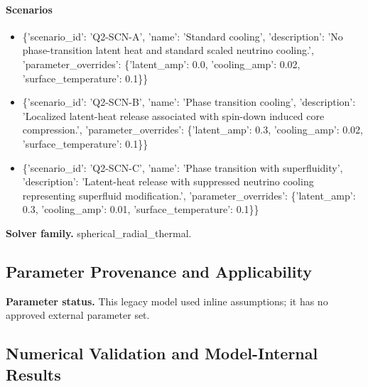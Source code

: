 \documentclass[11pt]{article}
\begin{document}
\paragraph{Scenarios}
\begin{itemize}\raggedright
\item \{'scenario\_\allowbreak{}id': 'Q2-SCN-A', 'name': 'Standard cooling', 'description': 'No phase-transition latent heat and standard scaled neutrino cooling.', 'parameter\_\allowbreak{}overrides': \{'latent\_\allowbreak{}amp': 0.0, 'cooling\_\allowbreak{}amp': 0.02, 'surface\_\allowbreak{}temperature': 0.1\}\}
\item \{'scenario\_\allowbreak{}id': 'Q2-SCN-B', 'name': 'Phase transition cooling', 'description': 'Localized latent-heat release associated with spin-down induced core compression.', 'parameter\_\allowbreak{}overrides': \{'latent\_\allowbreak{}amp': 0.3, 'cooling\_\allowbreak{}amp': 0.02, 'surface\_\allowbreak{}temperature': 0.1\}\}
\item \{'scenario\_\allowbreak{}id': 'Q2-SCN-C', 'name': 'Phase transition with superfluidity', 'description': 'Latent-heat release with suppressed neutrino cooling representing superfluid modification.', 'parameter\_\allowbreak{}overrides': \{'latent\_\allowbreak{}amp': 0.3, 'cooling\_\allowbreak{}amp': 0.01, 'surface\_\allowbreak{}temperature': 0.1\}\}
\end{itemize}

\noindent\textbf{Solver family.} spherical\_radial\_thermal.

\subsection{Parameter Provenance and Applicability}

\noindent\textbf{Parameter status.} This legacy model used inline assumptions; it has no approved external parameter set.

\subsection{Numerical Validation and Model-Internal Results}
\end{document}
